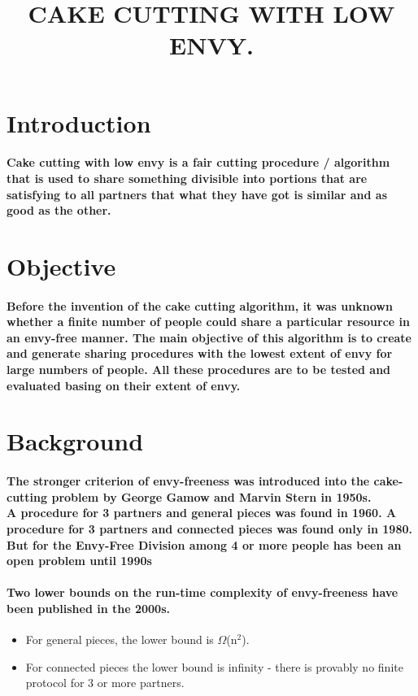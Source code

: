 \documentclass[12pt]{report}
\title{\textbf{CAKE CUTTING WITH LOW ENVY.}}
\author{}
\begin{document}
\maketitle

	\section{Introduction} 
	\paragraph{Cake cutting with low envy is a fair cutting procedure / algorithm that is used to share something divisible into portions that are satisfying to all partners that what they have got is similar and as good as the other. }
	
		\section{Objective}
		\paragraph{Before the invention of the cake cutting algorithm, it was unknown whether a finite number of people could share a particular resource in an envy-free manner. The main objective of this algorithm is to create and generate sharing procedures with the lowest extent of envy for large numbers of people. All these procedures are to be tested and evaluated basing on their extent of envy.  }
		
	\section{Background}
	\paragraph{The stronger criterion of envy-freeness was introduced into the cake-cutting problem by George Gamow and Marvin Stern in 1950s.\\
		A procedure for 3 partners and general pieces was found in 1960. A procedure for 3 partners and connected pieces was found only in 1980.\\
		But for the Envy-Free Division among 4 or more people has been an open problem until 1990s}
	\paragraph{Two lower bounds on the run-time complexity of envy-freeness have been published in the 2000s.}
	\begin{itemize}
		\item For general pieces, the lower bound is $\Omega$(n$^{2}$).
		\item For connected pieces the lower bound is infinity - there is provably no finite protocol for 3 or more partners.
	\end{itemize}
\end{document}
